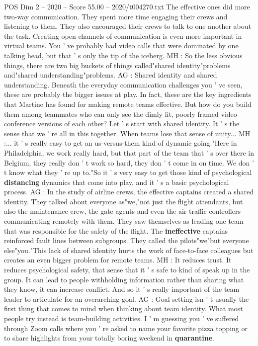\begin{textsample}{POS Dim 2 – 2020 – Score 55.00 – 2020/t004270.txt}
The effective ones did more two-way communication.
They spent more time engaging their crews and listening to them.
They also encouraged their crews to talk to one another about the task.
Creating open channels of communication is even more important in virtual teams.
You ' ve probably had video calls that were dominated by one talking head, but that ' s only the tip of the iceberg.
MH : So the less obvious things, there are two big buckets of things called"shared identity"problems and"shared understanding"problems.
AG : Shared identity and shared understanding.
Beneath the everyday communication challenges you ' ve seen, these are probably the bigger issues at play.
In fact, these are the key ingredients that Martine has found for making remote teams effective.
But how do you build them among teammates who can only see the dimly lit, poorly framed video conference versions of each other?
Let ' s start with shared identity.
It ' s the sense that we ' re all in this together.
When teams lose that sense of unity...
MH :... it ' s really easy to get an us-versus-them kind of dynamic going."Here in Philadelphia, we work really hard, but that part of the team that ' s over there in Belgium, they really don ' t work so hard, they don ' t come in on time.
We don ' t know what they ' re up to."So it ' s very easy to get those kind of psychological \textbf{distancing} dynamics that come into play, and it ' s a basic psychological process.
AG : In the study of airline crews, the effective captains created a shared identity.
They talked about everyone as"we,"not just the flight attendants, but also the maintenance crew, the gate agents and even the air traffic controllers communicating remotely with them.
They saw themselves as leading one team that was responsible for the safety of the flight.
The \textbf{ineffective} captains reinforced fault lines between subgroups.
They called the pilots"we"but everyone else"you."This lack of shared identity hurts the work of face-to-face colleagues but creates an even bigger problem for remote teams.
MH : It reduces trust.
It reduces psychological safety, that sense that it ' s safe to kind of speak up in the group.
It can lead to people withholding information rather than sharing what they know, it can increase conflict.
And so it ' s really important of the team leader to articulate for an overarching goal.
AG : Goal-setting isn ' t usually the first thing that comes to mind when thinking about team identity.
What most people try instead is team-building activities.
I ' m guessing you ' ve suffered through Zoom calls where you ' re asked to name your favorite pizza topping or to share highlights from your totally boring weekend in \textbf{quarantine}.

\end{textsample}
